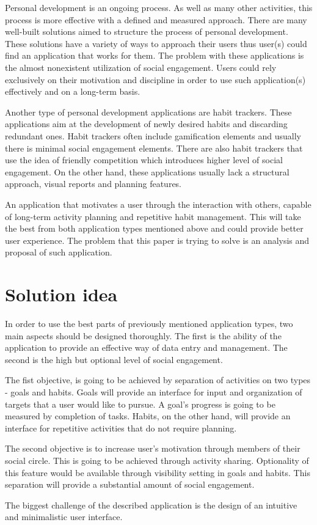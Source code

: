Personal development is an ongoing process.
As well as many other activities, this process is more effective with a defined and measured approach.
There are many well-built solutions aimed to structure the process of personal development.
These solutions have a variety of ways to approach their users thus user(s) could find an application that works for them.
The problem with these applications is the almost nonexistent utilization of social engagement.
Users could rely exclusively on their motivation and discipline in order to use such application(s) effectively and on a long-term basis.

Another type of personal development applications are habit trackers.
These applications aim at the development of newly desired habits and discarding redundant ones.
Habit trackers often include gamification elements and usually there is minimal social engagement elements.
There are also habit trackers that use the idea of friendly competition which introduces higher level of social engagement.
On the other hand, these applications usually lack a structural approach, visual reports and planning features.

An application that motivates a user through the interaction with others, capable of long-term activity planning and repetitive habit management.
This will take the best from both application types mentioned above and could provide better user experience.
The problem that this paper is trying to solve is an analysis and proposal of such application.


\section{Solution idea}\label{sec:solution-idea}

In order to use the best parts of previously mentioned application types, two main aspects should be designed thoroughly.
The first is the ability of the application to provide an effective way of data entry and management.
The second is the high but optional level of social engagement.

The fist objective, is going to be achieved by separation of activities on two types - goals and habits.
Goals will provide an interface for input and organization of targets that a user would like to pursue.
A goal's progress is going to be measured by completion of tasks.
Habits, on the other hand, will provide an interface for repetitive activities that do not require planning.

The second objective is to increase user's motivation through members of their social circle.
This is going to be achieved through activity sharing.
Optionality of this feature would be available through visibility setting in goals and habits.
This separation will provide a substantial amount of social engagement.

The biggest challenge of the described application is the design of an intuitive and minimalistic user interface.
